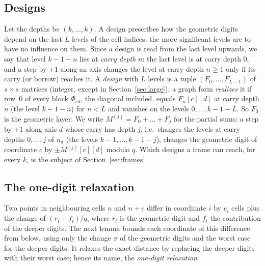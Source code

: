 \documentclass[11pt]{amsart}
\theoremstyle{definition}
\theoremstyle{plain}
\begin{document}
\subsection{Designs}
Let the depths be $(k,\dots,k)$. A design prescribes how the geometric digits depend on the last $L$ levels of the cell indices; the more significant levels are to have no influence on them. Since a design is read from the last level upwards, we say that level $k-1-n$ lies at \emph{carry depth} $n$: the last level is at carry depth $0$, and a step by $\pm1$ along an axis changes the level at carry depth $n\ge1$ only if its carry (or borrow) reaches it. A \emph{design} with $L$ levels is a tuple $(F_0,\dots,F_{L-1})$ of $s\times s$ matrices (integer, except in Section~\ref{sec:large}); a graph form \emph{realizes} it if row~$0$ of every block $\Phi_{cd}$, the diagonal included, equals $F_n[c][d]$ at carry depth $n$ (the level $k-1-n$) for $n<L$ and vanishes on the levels $0,\dots,k-1-L$. So $F_0$ is the geometric layer. We write $M^{(j)}=F_0+\dots+F_j$ for the partial sums: a step by $\pm1$ along axis $d$ whose carry has depth $j$, i.e.\ changes the levels at carry depths $0,\dots,j$ of $n_d$ (the levels $k-1,\dots,k-1-j$), changes the geometric digit of coordinate $c$ by $\pm M^{(j)}[c][d]$ modulo $q$. Which designs a frame can reach, for every $k$, is the subject of Section~\ref{sec:frames}.

\subsection{The one-digit relaxation}
Two points in neighbouring cells $n$ and $n+e$ differ in coordinate $i$ by $e_i$ cells plus the change of $(r_i+f_i)/q$, where $r_i$ is the geometric digit and $f_i$ the contribution of the deeper digits. The next lemma bounds each coordinate of this difference from below, using only the change $\sigma$ of the geometric digits and the worst case for the deeper digits. It relaxes the exact distance by replacing the deeper digits with their worst case; hence its name, the \emph{one-digit relaxation}.
\end{document}
